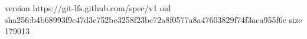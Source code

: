 version https://git-lfs.github.com/spec/v1
oid sha256:b4b68993f9c47d3e752be3258f23bc72a8f0577a8a47603829f74f3aca955f6e
size 179013

